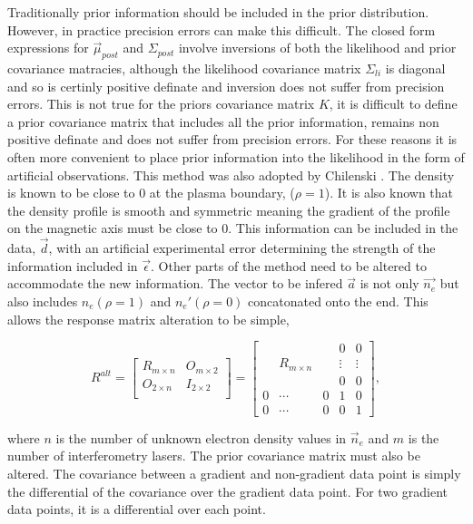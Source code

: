 
Traditionally prior information should be included in the prior distribution. However, in practice precision errors can make this difficult. The closed form expressions for $\vec{\mu}_{post}$ and $\Sigma_{post}$ involve inversions of both the likelihood and prior covariance matracies, although the likelihood covariance matrix $\Sigma_{li}$ is diagonal and so is certinly positive definate and inversion does not suffer from precision errors. This is not true for the priors covariance matrix $K$, it is difficult to define a prior covariance matrix that includes all the prior information, remains non positive definate and does not suffer from precision errors. For these reasons it is often more convenient to place prior information into the likelihood in the form of artificial observations. This method was also adopted by Chilenski \cite{chilenski}. The density is known to be close to 0 at the plasma boundary, ($\rho=1$). It is also known that the density profile is smooth and symmetric meaning the gradient of the profile on the magnetic axis must be close to 0. This information can be included in the data, $\vec{d}$, with an artificial experimental error determining the strength of the information included in $\vec{\epsilon}$. Other parts of the method need to be altered to accommodate the new information. The vector to be infered $\vec{a}$ is not only $\vec{n_e}$ but also includes $n_e(\rho=1)$ and $n_e'(\rho=0)$ concatonated onto the end. This allows the response matrix alteration to be simple,

\begin{equation}
  R^{alt} = 
\begin{bmatrix}
 R_{m\times n} &   O_{m\times2} \\
 O_{2\times n} &   I_{2\times 2} \\
\end{bmatrix}
=
\begin{bmatrix}
 &       &    & 0         & 0\\
  &   R_{m\times n}    &    &  \vdots  & \vdots\\
  &       &    & 0        & 0\\
0 & \cdots & 0  & 1        & 0 \\
0 & \cdots & 0  & 0        & 1
\end{bmatrix},
  \label{eq:Ralt}
\end{equation}

\noindent where $n$ is the number of unknown electron density values in $\vec n_e$ and $m$ is the number of interferometry lasers. The prior covariance matrix must also be altered. The covariance between a gradient and non-gradient data point is simply the differential of the covariance over the gradient data point. For two gradient data points, it is a differential over each point.

